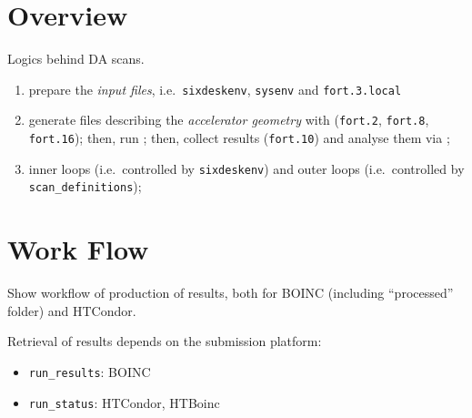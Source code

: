 \section{Overview} \label{Overview}
Logics behind DA scans.
\begin{enumerate}
\item prepare the \emph{input files}, i.e.~\texttt{sixdeskenv},
\texttt{sysenv} and \texttt{fort.3.local}
\item generate files describing the \emph{accelerator geometry}
  with \MADX{} (\texttt{fort.2}, \texttt{fort.8},
  \texttt{fort.16}); then, run \SIXTRACK{}; then, collect results
  (\texttt{fort.10}) and analyse them via \SIXDB{};
\item inner loops (i.e.~controlled by \texttt{sixdeskenv}) and outer loops
  (i.e.~controlled by \texttt{scan\_definitions});
\end{enumerate}

\section{Work Flow}
Show workflow of production of results, both for BOINC (including ``processed''
folder) and HTCondor.

Retrieval of results depends on the submission platform:
\begin{itemize}
\item \texttt{run\_results}: BOINC
\item \texttt{run\_status}: HTCondor, HTBoinc
\end{itemize}

